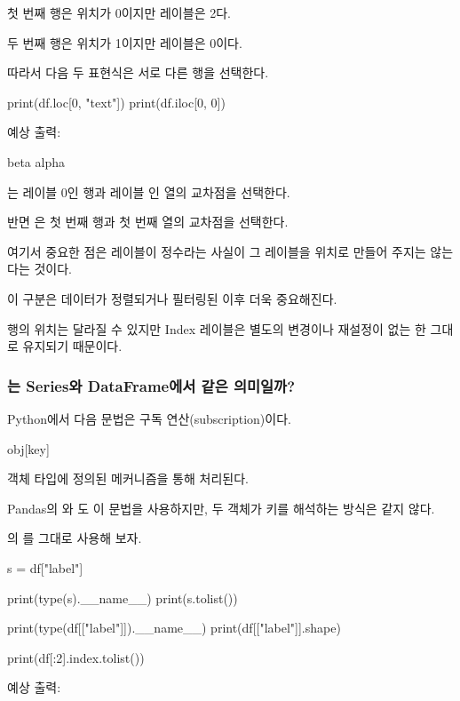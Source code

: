 첫 번째 행은 위치가 0이지만 레이블은 2다.

두 번째 행은 위치가 1이지만 레이블은 0이다.

따라서 다음 두 표현식은 서로 다른 행을 선택한다.

\begin{dhkcode}
print(df.loc[0, "text"])
print(df.iloc[0, 0])
\end{dhkcode}

예상 출력:

\begin{dhkzsh}
beta
alpha
\end{dhkzsh}

는 레이블 0인 행과 레이블 인 열의 교차점을 선택한다.

반면 은 첫 번째 행과 첫 번째 열의 교차점을 선택한다.

여기서 중요한 점은 레이블이 정수라는 사실이 그 레이블을 위치로 만들어 주지는 않는다는 것이다.

이 구분은 데이터가 정렬되거나 필터링된 이후 더욱 중요해진다.

행의 위치는 달라질 수 있지만 Index 레이블은 별도의 변경이나 재설정이 없는 한 그대로 유지되기 때문이다.

\subsubsection{\zsh{[]}는 Series와 DataFrame에서 같은 의미일까?}

Python에서 다음 문법은 구독 연산(subscription)이다.

\begin{dhkcode}
obj[key]
\end{dhkcode}

객체 타입에 정의된  메커니즘을 통해 처리된다.

Pandas의 와 도 이 문법을 사용하지만, 두 객체가 키를 해석하는 방식은 같지 않다.

의 를 그대로 사용해 보자.

\begin{dhkcode}
s = df["label"]

print(type(s).__name__)
print(s.tolist())

print(type(df[["label"]]).__name__)
print(df[["label"]].shape)

print(df[:2].index.tolist())
\end{dhkcode}

예상 출력:

